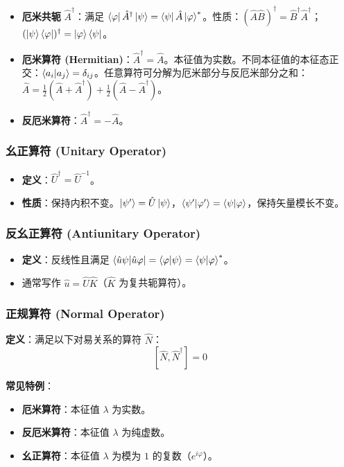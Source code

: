 \documentclass[12pt,a4paper]{article}
\begin{document}
\begin{itemize}
    \item \textbf{厄米共轭} $\hat{A}^\dagger$：满足 $\bra{\varphi}\hat{A}^\dagger\ket{\psi}=\bra{\psi}\hat{A}\ket{\varphi}^*$。性质：$(\hat{A}\hat{B})^\dagger=\hat{B}^\dagger\hat{A}^\dagger$；$(\ket{\psi}\bra{\varphi})^\dagger=\ket{\varphi}\bra{\psi}$。
    \item \textbf{厄米算符 (Hermitian)}：$\hat{A}^\dagger=\hat{A}$。本征值为实数。不同本征值的本征态正交：$\braket{a_i|a_j}=\delta_{ij}$。任意算符可分解为厄米部分与反厄米部分之和：$\hat{A}=\frac{1}{2}(\hat{A}+\hat{A}^\dagger)+\frac{1}{2}(\hat{A}-\hat{A}^\dagger)$。
    \item \textbf{反厄米算符}：$\hat{A}^\dagger=-\hat{A}$。
\end{itemize}

\subsubsection{幺正算符 (Unitary Operator)}

\begin{itemize}
    \item \textbf{定义}：$\hat{U}^\dagger=\hat{U}^{-1}$。
    \item \textbf{性质}：保持内积不变。$\ket{\psi'}=\hat{U}\ket{\psi}$，$\braket{\psi'|\varphi'}=\braket{\psi|\varphi}$，保持矢量模长不变。
\end{itemize}

\subsubsection{反幺正算符 (Antiunitary Operator)}

\begin{itemize}
    \item \textbf{定义}：反线性且满足 $\bra{\hat{u}\psi|\hat{u}\varphi}=\braket{\varphi|\psi}=\braket{\psi|\varphi}^*$。
    \item 通常写作 $\hat{u}=\hat{U}\hat{K}$（$\hat{K}$ 为复共轭算符）。
\end{itemize}

\subsubsection{正规算符 (Normal Operator)}

\textbf{定义}：满足以下对易关系的算符 $\hat{N}$：
\[
[\hat{N},\hat{N}^\dagger]=0
\]

\textbf{常见特例}：
\begin{itemize}
    \item \textbf{厄米算符}：本征值 $\lambda$ 为实数。
    \item \textbf{反厄米算符}：本征值 $\lambda$ 为纯虚数。
    \item \textbf{幺正算符}：本征值 $\lambda$ 为模为 $1$ 的复数（$e^{i\varphi}$）。
\end{itemize}
\end{document}
